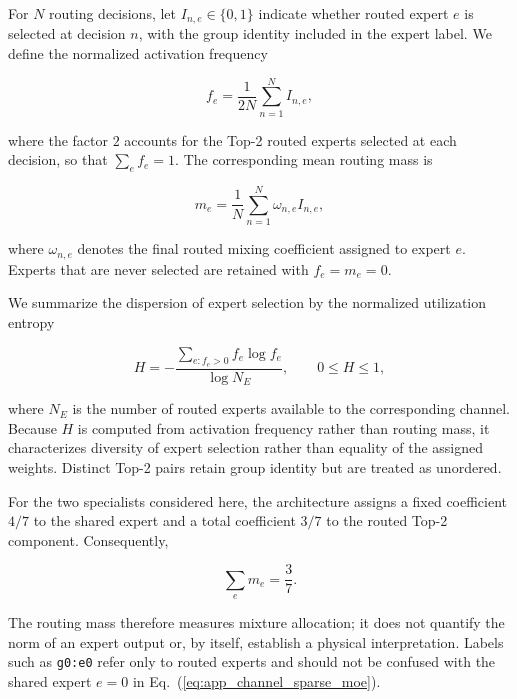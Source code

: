 \documentclass{article}
\def\plaineqref#1{\ref{#1}}
\begin{document}
For $N$ routing decisions, let $I_{n,e}\in\{0,1\}$ indicate whether routed expert $e$ is selected at decision $n$, with the group identity included in the expert label. We define the normalized activation frequency


\begin{equation}
  f_e
  =
  \frac{1}{2N}
  \sum_{n=1}^{N} I_{n,e},
  \label{eq:app_routing_frequency}
\end{equation}


where the factor $2$ accounts for the Top-2 routed experts selected at each decision, so that $\sum_e f_e=1$. The corresponding mean routing mass is


\begin{equation}
  m_e
  =
  \frac{1}{N}
  \sum_{n=1}^{N}
  \omega_{n,e}I_{n,e},
  \label{eq:app_routing_mass}
\end{equation}


where $\omega_{n,e}$ denotes the final routed mixing coefficient assigned to expert $e$. Experts that are never selected are retained with $f_e=m_e=0$.

We summarize the dispersion of expert selection by the normalized utilization entropy


\begin{equation}
  H
  =
  -\frac{
    \sum_{e:f_e>0} f_e\log f_e
  }{
    \log N_E
  },
  \qquad
  0\le H\le1,
  \label{eq:app_routing_entropy}
\end{equation}


where $N_E$ is the number of routed experts available to the corresponding channel. Because $H$ is computed from activation frequency rather than routing mass, it characterizes diversity of expert selection rather than equality of the assigned weights. Distinct Top-2 pairs retain group identity but are treated as unordered.

For the two specialists considered here, the architecture assigns a fixed coefficient $4/7$ to the shared expert and a total coefficient $3/7$ to the routed Top-2 component. Consequently,


\begin{equation}
  \sum_e m_e=\frac{3}{7}.
\end{equation}


The routing mass therefore measures mixture allocation; it does not quantify the norm of an expert output or, by itself, establish a physical interpretation.
Labels such as \texttt{g0:e0} refer only to routed experts and should not be confused with the shared expert $e=0$ in
Eq.~(\plaineqref{eq:app_channel_sparse_moe}).
\end{document}
